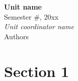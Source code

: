\documentclass{article}
\date{}
\newcommand{\unitName}{Unit name}
\newcommand{\unitTime}{Semester #, 20xx}
\newcommand{\unitCoordinator}{Unit coordinator name}
\newcommand{\documentAuthors}{Authors}
\begin{document}
%
\begin{titlepage}
    \vspace*{\fill}
    \begin{center}
        \LARGE{\textbf{\unitName}} \\[0.1in]
        \normalsize{\unitTime} \\[0.2in]
        \normalsize\textit{\unitCoordinator} \\[0.2in]
        \documentAuthors
    \end{center}
    \vspace*{\fill}
    \doclicenseThis
    \thispagestyle{empty}
\end{titlepage}
\newpage
%
\tableofcontents
\newpage
%
\section{Section 1}
\end{document}
